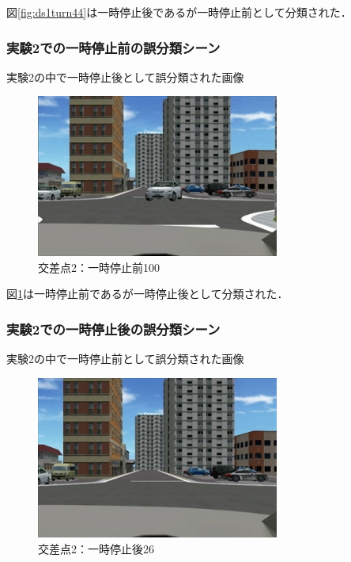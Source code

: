 図\ref{fig:ds1turn44}は一時停止後であるが一時停止前として分類された．\\


\subsubsection*{実験2での一時停止前の誤分類シーン}
実験2の中で一時停止後として誤分類された画像\\

\begin{figure}[htbp]
  \begin{center}
    \includegraphics[clip,width=8.0cm]{./images/ds2stop100.png}
    \caption{交差点2：一時停止前100}
    \label{fig:ds2stop100}
  \end{center}
\end{figure}

図\ref{fig:ds2stop100}は一時停止前であるが一時停止後として分類された．\\


\subsubsection*{実験2での一時停止後の誤分類シーン}
実験2の中で一時停止前として誤分類された画像\\

\begin{figure}[htbp]
  \begin{center}
    \includegraphics[clip,width=8.0cm]{./images/ds2turn026.png}
    \caption{交差点2：一時停止後26}
    \label{fig:ds2turn26}
  \end{center}
\end{figure}

